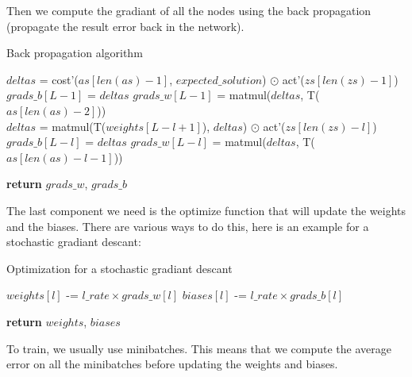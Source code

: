 \documentclass[a4paper]{article}
\begin{document}
Then we compute the gradiant of all the nodes using the back propagation
(propagate the result error back in the network).

\begin{algorithm}
  \caption{Back propagation algorithm}
  \begin{algorithmic}
      \State $deltas$ = cost'($as[len(as) - 1]$, $expected\_solution$) $\odot$ act'($zs[len(zs) - 1]$)
      \State $grads\_b[L - 1]$ = $deltas$
      \State $grads\_w[L - 1]$ = matmul($deltas$, T($as[len(as) - 2]$)) \\

        \State $deltas$ = matmul(T($weights[L - l + 1]$), $deltas$) $\odot$ act'($zs[len(zs) - l]$)
        \State $grads\_b[L - l]$ = $deltas$
        \State $grads\_w[L - l]$ = matmul($deltas$, T($as[len(as) - l - 1]$))
      \EndFor

      \State \textbf{return} $grads\_w$, $grads\_b$
    \EndProcedure
  \end{algorithmic}
\end{algorithm}

The last component we need is the optimize function that will update the weights
and the biases. There are various ways to do this, here is an example for a
stochastic gradiant descant:

\begin{algorithm}
  \caption{Optimization for a stochastic gradiant descant}
  \begin{algorithmic}
        \State $weights[l]$ -= $l\_rate \times grads\_w[l]$
        \State $biases[l]$ -= $l\_rate \times grads\_b[l]$
      \EndFor

      \State \textbf{return} $weights$, $biases$
    \EndProcedure
  \end{algorithmic}
\end{algorithm}

To train, we usually use minibatches. This means that we compute the average
error on all the minibatches before updating the weights and biases.
\end{document}
